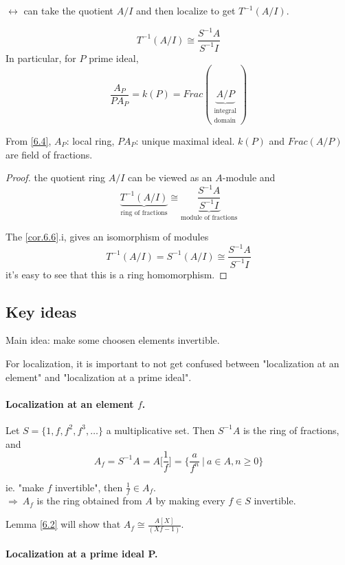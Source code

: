 \documentclass{article}
\theoremstyle{definition}
\newenvironment{cor}[1]
{\renewcommand\theinnercor{#1}\innercor}
{\endinnercor}
\begin{document}
$\longleftrightarrow$ can take the quotient $A/I$ and then localize to get $T^{-1}(A/I)$.


\begin{cor}{6.7} \label{6.7}
  $$T^{-1}(A/I) \cong \frac{S^{-1}A}{S^{-1}I}$$
  In particular, for $P$ prime ideal,
  $$\frac{A_P}{PA_P} = k(P) = Frac(\underbrace{A/P}_{\substack{\text{integral}\\\text{domain}}})$$

  From \ref{6.4}, $A_P$: local ring, $PA_P$: unique maximal ideal.
  $k(P)$ and $Frac(A/P)$ are field of fractions.
\end{cor}
\begin{proof}
  the quotient ring $A/I$ can be viewed as an $A$-module and
  $$\underbrace{ T^{-1}(A/I) }_{\text{ring of fractions}} \cong
  \underbrace{ \frac{S^{-1}A}{S^{-1}I} }_{\text{module of fractions}}$$

  The \ref{cor.6.6}.i, gives an isomorphism of modules
  $$ T^{-1}(A/I) = S^{-1}(A/I) \cong \frac{S^{-1}A}{S^{-1}I}$$
  it's easy to see that this is a ring homomorphism.
\end{proof}


\vspace{1.0cm}
\subsection{Key ideas}
Main idea: make some choosen elements invertible.

For localization, it is important to not get confused between "localization at an element" and "localization at a prime ideal".

\paragraph{Localization at an element $f$.}

Let $S=\{1, f, f^2, f^3, \ldots \}$ a multiplicative set. Then $S^{-1}A$ is the ring of fractions, and
$$A_f= S^{-1}A = A \big[ \frac{1}{f} \big] = \{\frac{a}{f^n} ~|~ a \in A, n \geq 0\}$$

ie. "make $f$ invertible", then $\frac{1}{f} \in A_f$.\\
$\Longrightarrow~ A_f$ is the ring obtained from $A$ by making every $f \in S$ invertible.

Lemma \ref{6.2} will show that $A_f \cong \frac{A[X]}{(Xf-1)}$.

\paragraph{Localization at a prime ideal P.}
\end{document}

